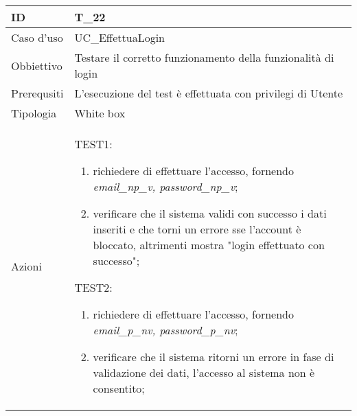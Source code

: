 \begin{table}[hb]
    \centering
    \begin{tabular}{ |p{2cm}|p{10cm}|  }
        \hline
        ID          & T\_22                                                         \\\hline
        Caso d'uso  & UC\_EffettuaLogin                                             \\\hline
        Obbiettivo  & Testare il corretto funzionamento della funzionalità di login \\\hline
        Prerequsiti & L'esecuzione del test è effettuata con privilegi di Utente    \\\hline
        Tipologia   & White box                                                     \\\hline
        Azioni      &
        TEST1:
        \begin{enumerate}[nosep, topsep=0pt]
            \item richiedere di effettuare l'accesso, fornendo \emph{email\_np\_v, password\_np\_v};
            \item verificare che il sistema validi con successo i dati inseriti e che torni un errore sse l'account è bloccato, altrimenti mostra "login effettuato con successo";
        \end{enumerate}
        \vspace{0.5cm} TEST2:
        \begin{enumerate}[nosep, topsep=0pt]
            \item richiedere di effettuare l'accesso, fornendo \emph{email\_p\_nv, password\_p\_nv};
            \item verificare che il sistema ritorni un errore in fase di validazione dei dati, l'accesso al sistema non è consentito;
        \end{enumerate}
        \\\hline
    \end{tabular}
\end{table}


